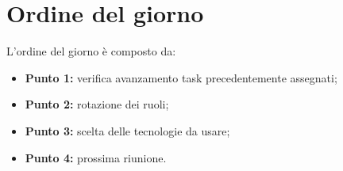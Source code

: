 \section{Ordine del giorno}
L'ordine del giorno è composto da: 
\begin{itemize}
	\item \textbf{Punto 1:} verifica avanzamento task precedentemente assegnati;
	\item \textbf{Punto 2:} rotazione dei ruoli;
	\item \textbf{Punto 3:} scelta delle tecnologie da usare;
	\item \textbf{Punto 4:} prossima riunione.
\end{itemize}
